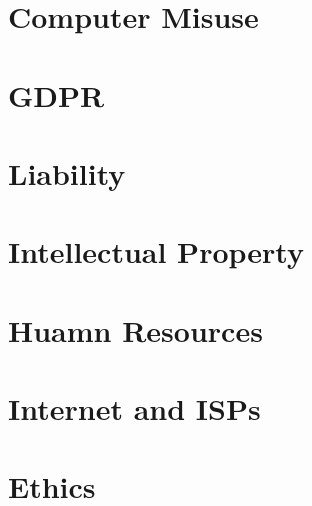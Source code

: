 \section{Computer Misuse}
\section{GDPR}
\section{Liability}
\section{Intellectual Property}
\section{Huamn Resources}
\section{Internet and ISPs}
\section{Ethics}